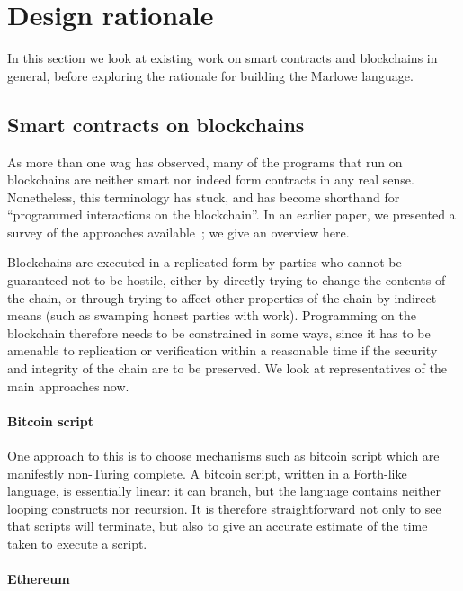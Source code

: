 \documentclass[
      acmsmall
    , screen
    , review=true
  ]{acmart}
\begin{document}
\section{Design rationale}
\label{section:design}


\medskip
\noindent
In this section we look at existing work on smart contracts and blockchains in general, before exploring the rationale for building the Marlowe language.

\subsection{Smart contracts on blockchains}

As more than one wag has observed, many of the programs that run on blockchains are neither smart nor indeed form 
contracts in any real sense. Nonetheless, this terminology has stuck, and has become shorthand for ``programmed 
interactions on the blockchain''. In an earlier paper, we presented a survey of the approaches 
available~\cite{cryptoeprint:2016:1156}; we give an overview here.

Blockchains are executed in a replicated form by parties who cannot be guaranteed not to be hostile, either by directly trying to change the contents of the chain, or through trying to affect other properties of the chain by indirect means (such as swamping honest parties with work). Programming on the blockchain therefore needs to be constrained in some ways, since it has to be amenable to replication or verification within a reasonable time if the security and integrity of the chain are to be preserved. We look at representatives of the main approaches now.

\paragraph{Bitcoin script}

One approach to this is to choose mechanisms such as bitcoin script which are manifestly non-Turing complete. A bitcoin script, written in a Forth-like language, is essentially linear: it can branch, but the language contains neither looping constructs nor recursion. It is therefore straightforward not only to see that scripts will terminate, but also to give an accurate estimate of the time taken to execute a script. 

\paragraph{Ethereum}
\end{document}
